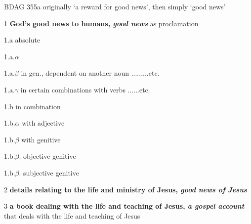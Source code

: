 				\begin{compactdesc}
					\item[BDAG 355a] originally `a reward for good news', then simply `good news'
						\begin{compactitem}
							\item[1] \textbf{God's good news to humans, \textit{good news}} as proclamation
							\item[1.a] absolute
							\item[1.a.$\alpha$] 
							\item[1.a.$\beta$] in gen., dependent on another noun .........etc.
							\item[1.a.$\gamma$] in certain combinations with verbs ......etc.
							\item[1.b] in combination
							\item[1.b.$\alpha$] with adjective
							\item[1.b.$\beta$] with genitive
							\item[1.b.$\beta$.\heb{'}] objective genitive
							\item[1.b.$\beta$.\heb{b}] subjective genitive
							\item[2] \textbf{details relating to the life and ministry of Jesus, \textit{good news of Jesus}}
							\item[3] \textbf{a book dealing with the life and teaching of Jesus, \textit{a gospel account}} that deals with the life and teaching of Jesus
						\end{compactitem}
				\end{compactdesc}
				
		
